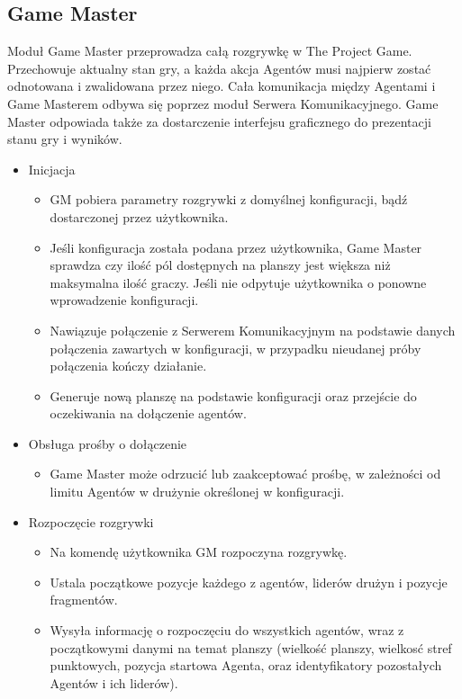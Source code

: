 \documentclass[../Dokumentacja.tex]{subfiles}
\begin{document}
\subsection{Game Master}
Moduł Game Master przeprowadza całą rozgrywkę w The Project Game. Przechowuje aktualny stan gry,
a każda akcja Agentów musi najpierw zostać odnotowana i zwalidowana przez niego.
Cała komunikacja między Agentami i Game Masterem odbywa się poprzez moduł Serwera Komunikacyjnego.
Game Master odpowiada także za dostarczenie interfejsu graficznego do prezentacji stanu gry i wyników.


\begin{itemize}
	\item Inicjacja
	\begin{itemize}
		\item GM pobiera parametry rozgrywki z domyślnej konfiguracji, bądź dostarczonej przez użytkownika.
		\item Jeśli konfiguracja została podana przez użytkownika, Game Master sprawdza czy ilość pól dostępnych na planszy jest większa niż maksymalna ilość graczy. Jeśli nie odpytuje użytkownika o ponowne wprowadzenie konfiguracji.
		\item Nawiązuje połączenie z Serwerem Komunikacyjnym na podstawie danych połączenia zawartych w konfiguracji, w przypadku nieudanej próby połączenia kończy działanie.
		\item Generuje nową planszę na podstawie konfiguracji oraz przejście do oczekiwania na dołączenie agentów.
	\end{itemize}
	\item Obsługa prośby o dołączenie
	\begin{itemize}
		\item Game Master może odrzucić lub zaakceptować prośbę, w zależności od limitu Agentów w drużynie określonej w konfiguracji.
	\end{itemize}
		\item Rozpoczęcie rozgrywki
	\begin{itemize}
		\item Na komendę użytkownika GM rozpoczyna rozgrywkę.
		\item Ustala początkowe pozycje każdego z agentów, liderów drużyn i pozycje fragmentów.
		\item Wysyła informację o rozpoczęciu do wszystkich agentów, wraz z początkowymi danymi na temat planszy (wielkość planszy, wielkosć stref punktowych, pozycja startowa Agenta, oraz identyfikatory pozostałych Agentów i ich liderów).

\end{itemize}
\end{itemize}
\end{document}
